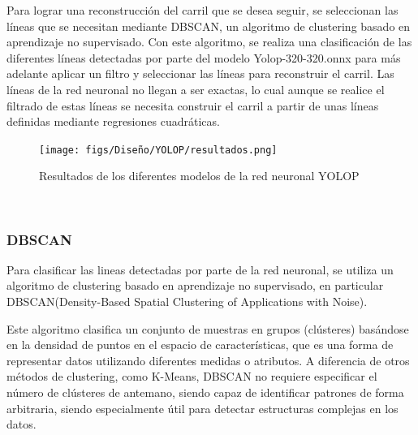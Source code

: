 Para lograr una reconstrucción del carril que se desea seguir, se seleccionan las líneas que se necesitan mediante DBSCAN, un algoritmo de clustering basado en aprendizaje no supervisado. 
Con este algoritmo, se realiza una clasificación de las diferentes líneas detectadas por parte del modelo Yolop-320-320.onnx para más adelante aplicar un filtro y seleccionar las líneas 
para reconstruir el carril. Las líneas de la red neuronal no llegan a ser exactas, lo cual aunque se realice el filtrado de estas líneas se necesita construir el carril a partir de unas líneas 
definidas mediante regresiones cuadráticas. 
\begin{figure} [H]
  \begin{center}
    \texttt{[image: figs/Diseño/YOLOP/resultados.png]}
  \end{center}
  \caption{Resultados de los diferentes modelos de la red neuronal YOLOP}
  \label{Resultados de los diferentes modelos de la red neuronal YOLOP}
\end{figure}\

\subsubsection{DBSCAN}
\label{sec:DBSCAN}

Para clasificar las lineas detectadas por parte de la red neuronal, se utiliza un algoritmo de clustering basado en aprendizaje no supervisado, en particular
DBSCAN(Density-Based Spatial Clustering of Applications with Noise)\cite{ski_dbs}.\newline

Este algoritmo clasifica un conjunto de muestras en grupos (clústeres) basándose en la densidad de puntos en el espacio de características, que es una forma de representar
datos utilizando diferentes medidas o atributos. A diferencia de otros métodos de clustering, como K-Means, DBSCAN no requiere especificar el número de clústeres de antemano, 
siendo capaz de identificar patrones de forma arbitraria, siendo especialmente útil para detectar estructuras complejas en los datos. 

